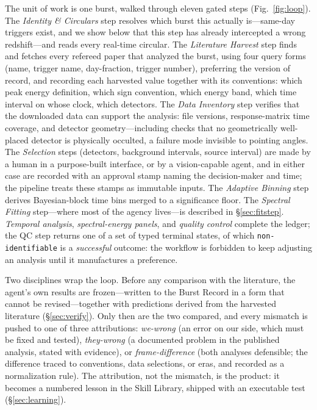 \documentclass[twocolumn]{aastex631}
\begin{document}
The unit of work is one burst, walked through eleven gated steps
(Fig.~\ref{fig:loop}). The \emph{Identity \& Circulars} step resolves which
burst this actually is---same-day triggers exist, and we show below that this
step has already intercepted a wrong redshift---and reads every real-time
circular. The \emph{Literature Harvest} step finds and fetches every refereed
paper that analyzed the burst, using four query forms (name, trigger name,
day-fraction, trigger number), preferring the version of record, and
recording each harvested value together with its conventions: which peak
energy definition, which sign convention, which energy band, which time
interval on whose clock, which detectors. The \emph{Data Inventory} step
verifies that the downloaded data can support the analysis: file versions,
response-matrix time coverage, and detector geometry---including checks that
no geometrically well-placed detector is physically occulted, a failure mode
invisible to pointing angles. The \emph{Selection} steps (detectors,
background intervals, source interval) are made by a human in a purpose-built
interface, or by a vision-capable agent, and in either case are recorded with
an approval stamp naming the decision-maker and time; the pipeline treats
these stamps as immutable inputs. The \emph{Adaptive Binning} step derives
Bayesian-block time bins merged to a significance floor. The \emph{Spectral
Fitting} step---where most of the agency lives---is described in
\S\ref{sec:fitstep}. \emph{Temporal analysis}, \emph{spectral-energy
panels}, and \emph{quality control} complete the ledger; the QC step returns
one of a set of typed terminal states, of which \texttt{non-identifiable} is
a \emph{successful} outcome: the workflow is forbidden to keep adjusting an
analysis until it manufactures a preference.

Two disciplines wrap the loop. Before any comparison with the literature, the
agent's own results are frozen---written to the Burst Record in a form that
cannot be revised---together with predictions derived from the harvested
literature (\S\ref{sec:verify}). Only then are the two compared, and every
mismatch is pushed to one of three attributions: \emph{we-wrong} (an error on
our side, which must be fixed and tested), \emph{they-wrong} (a documented
problem in the published analysis, stated with evidence), or
\emph{frame-difference} (both analyses defensible; the difference traced to
conventions, data selections, or eras, and recorded as a normalization rule).
The attribution, not the mismatch, is the product: it becomes a numbered
lesson in the Skill Library, shipped with an executable test
(\S\ref{sec:learning}).
\end{document}
